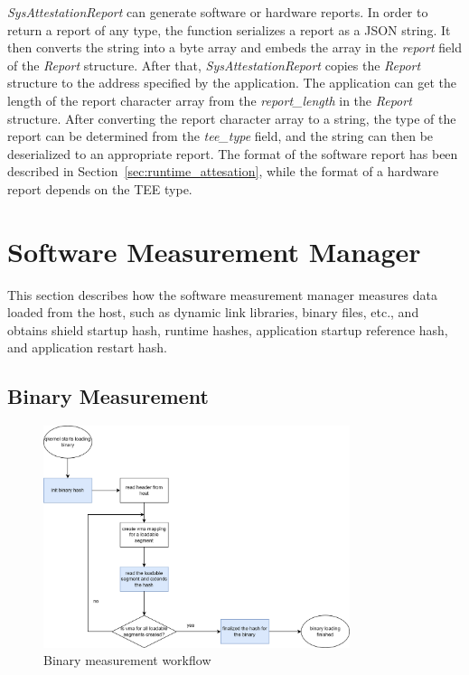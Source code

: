 \emph{SysAttestationReport} can generate software or hardware reports. In order to return a report of any type, the function serializes a report as a JSON string. It then converts the string into a byte array and embeds the array in the \emph{report} field of the \emph{Report} structure. After that, 
\emph{SysAttestationReport} copies the \emph{Report} structure to the address specified by the application. The application can get the length of the report character array from the \emph{report\_length} in the \emph{Report} structure. After converting the report character array to a string, 
the type of the report can be determined from the \emph{tee\_type} field, and the string can then be deserialized to an appropriate report. The format of the software report has been described in Section~\ref{sec:runtime_attesation}, while the format of a hardware report depends on the 
\acrshort{TEE} type.

\section{Software Measurement Manager}
\label{sec:impl_measurement}

This section describes how the software measurement manager measures data loaded from the host, such as dynamic link libraries, binary files, etc., and obtains shield startup hash, runtime hashes, application startup reference hash, and application restart hash.

\subsection{Binary Measurement}

\begin{figure}[!htb]
    \centering
    \includegraphics[width=0.8\textwidth]{images/measure_binary.png}
    \caption[Binary measurement workflow]{Binary measurement workflow}
    \label{fig:binary_measurement}
\end{figure}

